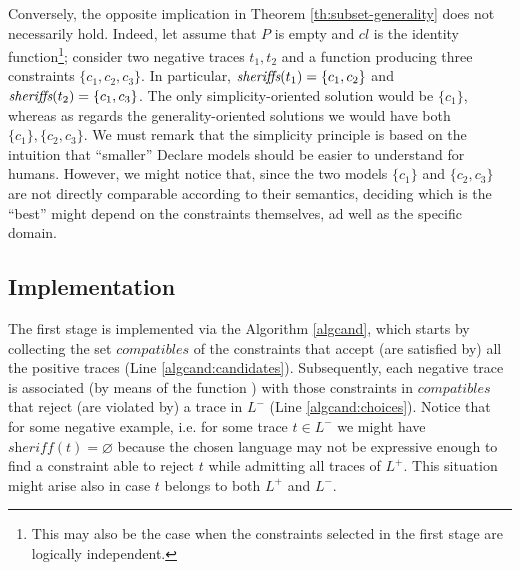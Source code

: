 Conversely, the opposite implication in Theorem \ref{th:subset-generality} does not necessarily hold. Indeed, let assume that $P$ is empty and $cl$ is the identity function\footnote{This may also be the case when the constraints selected in the first stage are logically independent.}; consider two negative traces $t_1, t_2$ and a \textit{\sheriff} function producing three constraints $\{c_1, c_2,c_3\}$. In particular, $\textit{sheriffs}(t_1)=\{c_1, c_2\}$ and $\textit{sheriffs}(t_2)=\{c_1, c_3\}$. The only simplicity-oriented solution would be  $\{c_1\}$, whereas as regards the generality-oriented solutions we would have both $\{c_1\}, \{c_2, c_3\}$. We must remark that the simplicity principle is based on the intuition that ``smaller'' Declare models should be easier to understand for humans. However, we might notice that, since the two models $\{c_1\}$ and $\{c_2, c_3\}$ are not directly comparable according to their semantics, deciding which is the ``best'' might depend on the constraints themselves, ad well as the specific domain.





\subsection{Implementation}
\label{subsec:impl}

The first stage is implemented via the Algorithm \ref{algcand}, which starts by collecting the set $compatibles$ of the constraints that accept (are satisfied by) all the positive traces (Line \ref{algcand:candidates}). Subsequently, each negative trace is associated (by means of the function \textit{\sheriff}) with those constraints in $compatibles$ that reject (are violated by) a trace in $L^-$ (Line \ref{algcand:choices}). Notice that for some negative example, i.e. for some trace $t\in L^-$ we might have $\textit{sheriff}(t)=\varnothing$ because the chosen language may not be expressive enough to find a constraint able to reject $t$ while admitting all traces of $L^+$. This situation might arise also in case $t$ belongs to both $L^+$ and $L^-$.
%

